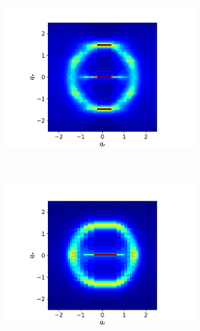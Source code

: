 \documentclass{article}
\begin{document}
\begin{figure}[ht]
\begin{subfigure}{.83\linewidth}
\begin{subfigure}{0.4\linewidth}
		\centering
		\includegraphics[width=\linewidth, trim={2cm 0 2.5cm 1.25cm}, clip]{rzplot_layered.png}
		\caption{}~\label{fig:rz_layered}
	\end{subfigure}%
	\begin{subfigure}{0.4\linewidth}
		\centering
		\includegraphics[width=\linewidth, trim={2cm 0 2.5cm 1.25cm}, clip]{rzplot_disordered.png}
		\caption{}~\label{fig:rz_disordered}
	\end{subfigure}
\end{subfigure}%
\begin{subfigure}{0.14\linewidth}
	\centering
	\vspace{-1cm}

\end{subfigure}
\end{figure}
\end{document}
